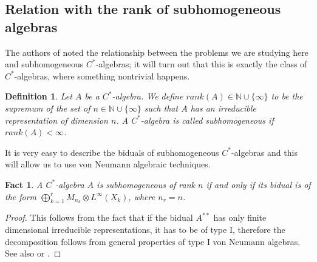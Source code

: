 \documentclass[11pt]{article}
\numberwithin{theorem}{section}
\newtheorem{definition}[theorem]{Definition}
\newtheorem{fact}[theorem]{Fact}
\begin{document}
\subsection{Relation with the rank of subhomogeneous algebras}
The authors of \cite{MusatRordam} noted the relationship between the problems we are studying here and subhomogeneous $C^{\ast}$-algebras; it will turn out that this is exactly the class of $C^{\ast}$-algebras, where something nontrivial happens.
\begin{definition}
Let $A$ be a $C^{\ast}$-algebra. We define $rank(A) \in \mathbb{N} \cup \{\infty\}$ to be the supremum of the set of  $n \in \mathbb{N} \cup \{\infty\}$ such that $A$ has an irreducible representation of dimension $n$. A $C^{\ast}$-algebra is called \emph{subhomogeneous} if $rank(A) < \infty$.
\end{definition}
It is very easy to describe the biduals of subhomogeneous $C^{\ast}$-algebras and this will allow us to use von Neumann algebraic techniques. 
\begin{fact}
A $C^{\ast}$-algebra $A$ is subhomogeneous of rank $n$ if and only if its bidual is of the form $\bigoplus_{k=1}^{r} M_{n_{k}} \otimes L^{\infty}(X_{k})$, where $n_{r} = n$.
\end{fact}
\begin{proof}
This follows from the fact that if the bidual $A^{\ast\ast}$ has only finite dimensional irreducible representations, it has to be of type I, therefore the decomposition follows from general properties of type I von Neumann algebras. See also \cite[Proposition IV.1.4.6]{Blackadar} or \cite[Chapter 2: Proposition 7.7]{BrownOzawa}.
\end{proof}
\end{document}
